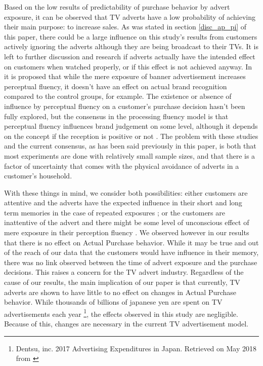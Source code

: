 \documentclass[review]{elsarticle}
\begin{document}
Based on the low results of predictability of purchase behavior by advert exposure, it can be observed that TV adverts have a low probability of achieving their main purpose: to increase sales. As was stated in section \ref{disc_ap_pi} of this paper, there could be a large influence on this study's results from customers actively ignoring the adverts although they are being broadcast to their TVs. It is left to further discussion and research if adverts actually have the intended effect on customers when watched properly, or if this effect is not achieved anyway. In \cite{fang} it is proposed that while the mere exposure of banner advertisement increases perceptual fluency, it doesn't have an effect on actual brand recognition compared to the control groups, for example. The existence or absence of influence by perceptual fluency on a customer's purchase decision hasn't been fully explored, but the consensus in the processing fluency model is that perceptual fluency influences brand judgement on some level, although it depends on the concept if the reception is positive or not \cite{lee-a}. The problem with these studies and the current consensus, as has been said previously in this paper, is both that most experiments are done with relatively small sample sizes, and that there is a factor of uncertainty that comes with the physical avoidance of adverts in a customer's household.

With these things in mind, we consider both possibilities: either customers are attentive and the adverts have the expected influence in their short and long term memories in the case of repeated exposures \cite{rossiter}; or the customers are inattentive of the advert and there might be some level of unconscious effect of mere exposure in their perception fluency \cite{fang}. We observed however in our results that there is no effect on Actual Purchase behavior. While it may be true and out of the reach of our data that the customers would have influence in their memory, there was no link observed between the time of advert exposure and the purchase decisions. This raises a concern for the TV advert industry. Regardless of the cause of our results, the main implication of our paper is that currently, TV adverts are shown to have little to no effect on changes in Actual Purchase behavior. While thousands of billions of japanese yen are spent on TV advertisements each year \footnote{\label{dentsu}Dentsu, inc. 2017 Advertising Expenditures in Japan. Retrieved on May 2018 from \href {http://www.dentsu.com/knowledgeanddata/ad_expenditures/pdf/expenditures_2017.pdf}{}}, the effects observed in this study are negligible. Because of this, changes are necessary in the current TV advertisement model.
\end{document}
